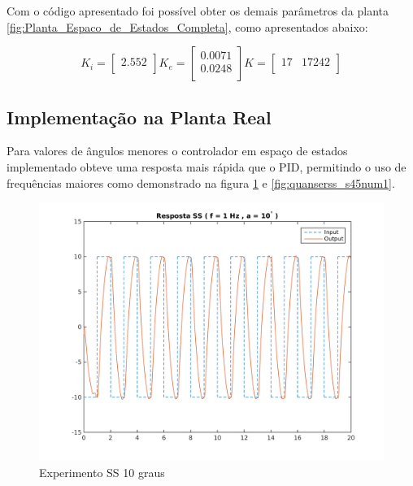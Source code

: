 \documentclass[a4paper,11pt]{article}
\begin{document}
Com o código apresentado foi possível obter os demais parâmetros da planta \ref{fig:Planta_Espaco_de_Estados_Completa}, como apresentados abaixo:

\begin{equation}
K_i = \left[\begin{array}{c}
    2.552 \\
\end{array}\right]
K_e = \left[\begin{array}{c}
    0.0071 \\
    0.0248 \\
\end{array}
\right]
K = \left[\begin{array}{cc}
    17 & 17 242 \\
\end{array}
\right]
\end{equation}

\subsection{Implementação na Planta Real}

Para valores de ângulos menores o controlador em espaço de estados implementado obteve uma resposta mais rápida que o PID, permitindo o uso de frequências maiores como demonstrado na figura \ref{fig:quanserss_s10num1} e \ref{fig:quanserss_s45num1}.

\begin{figure}[H]
    \centering
    \includegraphics[width=0.8\linewidth]{tex/img/quanserss_s10num1.png}
    \caption{Experimento SS 10 graus}
    \label{fig:quanserss_s10num1}
\end{figure}
\end{document}

